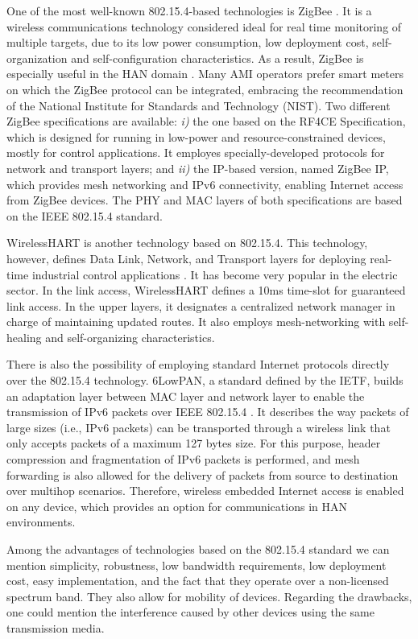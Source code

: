 \documentclass[11pt,draftclsnofoot,onecolumn]{IEEEtran}
\begin{document}
One of the most well-known 802.15.4-based technologies is ZigBee \cite{Alliance2010}. It is a wireless communications technology considered ideal for real time monitoring of multiple targets, due to its low power consumption, low deployment cost, self-organization and self-configuration characteristics. As a result, ZigBee is especially useful in the HAN domain \cite{Sabbah2014}. Many AMI operators prefer smart meters on which the ZigBee protocol can be integrated, embracing the recommendation of the National Institute for Standards and Technology (NIST). Two different ZigBee specifications are available: \textit{i)} the one based on the RF4CE Specification, which is designed for running in low-power and resource-constrained devices, mostly for control applications. It employes specially-developed protocols for network and transport layers; and \textit{ii)} the IP-based version, named ZigBee IP, which provides mesh networking and IPv6 connectivity, enabling Internet access from ZigBee devices. The PHY and MAC layers of both specifications are based on the IEEE 802.15.4 standard.  

WirelessHART is another technology based on 802.15.4. This technology, however, defines Data Link, Network, and Transport layers for deploying real-time industrial control applications \cite{Song2008}. It has become very popular in the electric sector. In the link access, WirelessHART defines a 10ms time-slot for guaranteed link access. In the upper layers, it designates a centralized network manager in charge of maintaining updated routes. It also employs mesh-networking with self-healing and self-organizing characteristics.

There is also the possibility of employing standard Internet protocols directly over the 802.15.4 technology. 6LowPAN, a standard defined by the IETF, builds an adaptation layer between MAC layer and network layer to enable the transmission of IPv6 packets over IEEE 802.15.4 \cite{RFC4944}.  It describes the way packets of large sizes (i.e., IPv6 packets) can be transported through a wireless link that only accepts packets of a maximum 127 bytes size. For this purpose, header compression and fragmentation of IPv6 packets is performed, and mesh forwarding is also allowed for the delivery of packets from source to destination over multihop scenarios. Therefore, wireless embedded Internet access is enabled on any device, which provides an option for communications in HAN environments.
 
Among the advantages of technologies based on the 802.15.4 standard we can mention simplicity, robustness, low bandwidth requirements, low deployment cost, easy implementation, and the fact that they operate over a non-licensed spectrum band. They also allow for mobility of  devices. Regarding the drawbacks, one could mention the interference caused by other devices using the same transmission media. %
 
\end{document}
